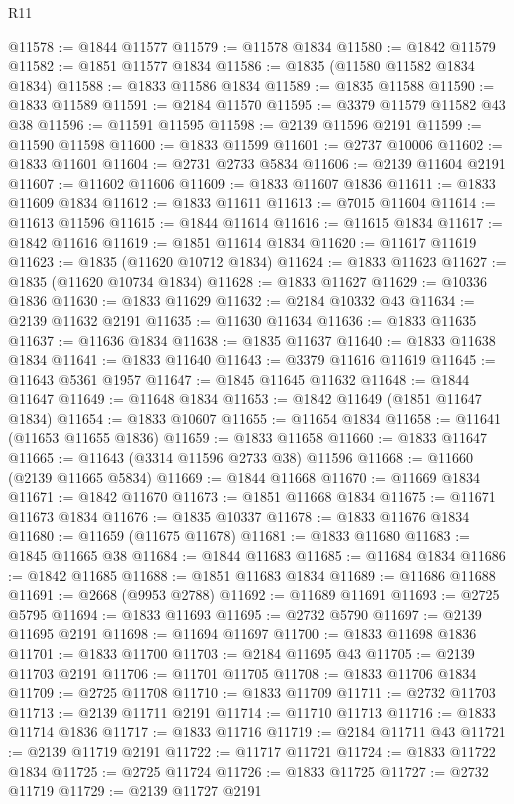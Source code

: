 \begin{lexlean}{R11}
\begin{coremodule}
@11578 := @1844 @11577
@11579 := @11578 @1834
@11580 := @1842 @11579
@11582 := @1851 @11577 @1834
@11586 := @1835 (@11580 @11582 @1834 @1834)
@11588 := @1833 @11586 @1834
@11589 := @1835 @11588
@11590 := @1833 @11589
@11591 := @2184 @11570
@11595 := @3379 @11579 @11582 @43 @38
@11596 := @11591 @11595
@11598 := @2139 @11596 @2191
@11599 := @11590 @11598
@11600 := @1833 @11599
@11601 := @2737 @10006
@11602 := @1833 @11601
@11604 := @2731 @2733 @5834
@11606 := @2139 @11604 @2191
@11607 := @11602 @11606
@11609 := @1833 @11607 @1836
@11611 := @1833 @11609 @1834
@11612 := @1833 @11611
@11613 := @7015 @11604
@11614 := @11613 @11596
@11615 := @1844 @11614
@11616 := @11615 @1834
@11617 := @1842 @11616
@11619 := @1851 @11614 @1834
@11620 := @11617 @11619
@11623 := @1835 (@11620 @10712 @1834)
@11624 := @1833 @11623
@11627 := @1835 (@11620 @10734 @1834)
@11628 := @1833 @11627
@11629 := @10336 @1836
@11630 := @1833 @11629
@11632 := @2184 @10332 @43
@11634 := @2139 @11632 @2191
@11635 := @11630 @11634
@11636 := @1833 @11635
@11637 := @11636 @1834
@11638 := @1835 @11637
@11640 := @1833 @11638 @1834
@11641 := @1833 @11640
@11643 := @3379 @11616 @11619
@11645 := @11643 @5361 @1957
@11647 := @1845 @11645 @11632
@11648 := @1844 @11647
@11649 := @11648 @1834
@11653 := @1842 @11649 (@1851 @11647 @1834)
@11654 := @1833 @10607
@11655 := @11654 @1834
@11658 := @11641 (@11653 @11655 @1836)
@11659 := @1833 @11658
@11660 := @1833 @11647
@11665 := @11643 (@3314 @11596 @2733 @38) @11596
@11668 := @11660 (@2139 @11665 @5834)
@11669 := @1844 @11668
@11670 := @11669 @1834
@11671 := @1842 @11670
@11673 := @1851 @11668 @1834
@11675 := @11671 @11673 @1834
@11676 := @1835 @10337
@11678 := @1833 @11676 @1834
@11680 := @11659 (@11675 @11678)
@11681 := @1833 @11680
@11683 := @1845 @11665 @38
@11684 := @1844 @11683
@11685 := @11684 @1834
@11686 := @1842 @11685
@11688 := @1851 @11683 @1834
@11689 := @11686 @11688
@11691 := @2668 (@9953 @2788)
@11692 := @11689 @11691
@11693 := @2725 @5795
@11694 := @1833 @11693
@11695 := @2732 @5790
@11697 := @2139 @11695 @2191
@11698 := @11694 @11697
@11700 := @1833 @11698 @1836
@11701 := @1833 @11700
@11703 := @2184 @11695 @43
@11705 := @2139 @11703 @2191
@11706 := @11701 @11705
@11708 := @1833 @11706 @1834
@11709 := @2725 @11708
@11710 := @1833 @11709
@11711 := @2732 @11703
@11713 := @2139 @11711 @2191
@11714 := @11710 @11713
@11716 := @1833 @11714 @1836
@11717 := @1833 @11716
@11719 := @2184 @11711 @43
@11721 := @2139 @11719 @2191
@11722 := @11717 @11721
@11724 := @1833 @11722 @1834
@11725 := @2725 @11724
@11726 := @1833 @11725
@11727 := @2732 @11719
@11729 := @2139 @11727 @2191

\end{coremodule}
\end{lexlean}
